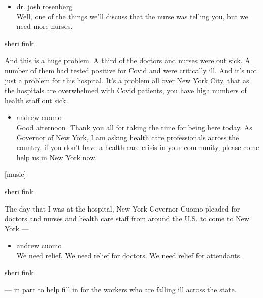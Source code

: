 \begin{itemize}
\tightlist
\item
  dr. josh rosenberg\\
  Well, one of the things we'll discuss that the nurse was telling you,
  but we need more nurses.
\end{itemize}

sheri fink

And this is a huge problem. A third of the doctors and nurses were out
sick. A number of them had tested positive for Covid and were critically
ill. And it's not just a problem for this hospital. It's a problem all
over New York City, that as the hospitals are overwhelmed with Covid
patients, you have high numbers of health staff out sick.

\begin{itemize}
\tightlist
\item
  andrew cuomo\\
  Good afternoon. Thank you all for taking the time for being here
  today. As Governor of New York, I am asking health care professionals
  across the country, if you don't have a health care crisis in your
  community, please come help us in New York now.
\end{itemize}

{[}music{]}

sheri fink

The day that I was at the hospital, New York Governor Cuomo pleaded for
doctors and nurses and health care staff from around the U.S. to come to
New York ---

\begin{itemize}
\tightlist
\item
  andrew cuomo\\
  We need relief. We need relief for doctors. We need relief for
  attendants.
\end{itemize}

sheri fink

--- in part to help fill in for the workers who are falling ill across
the state.

